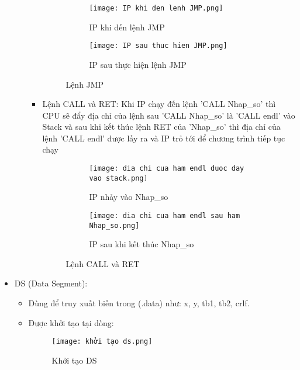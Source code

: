 \begin{itemize}
\begin{itemize}
\begin{itemize}
            \begin{figure}[H]
                \begin{subfigure}[b]{0.4\linewidth}
                    \centering
                    \texttt{[image: IP khi den lenh JMP.png]}
                    \caption{IP khi đến lệnh JMP}
                \end{subfigure}
                \hfill
                \begin{subfigure}[b]{0.4\linewidth}
                    \centering
                    \texttt{[image: IP sau thuc hien JMP.png]}
                    \caption{IP sau thực hiện lệnh JMP}
                \end{subfigure}
                \caption{Lệnh JMP}
            \end{figure}
            \item Lệnh CALL và RET: Khi IP chạy đến lệnh 'CALL Nhap\_so' thì CPU sẽ đẩy địa chỉ của lệnh sau 'CALL Nhap\_so' là 'CALL endl' vào Stack và sau khi kết thúc lệnh RET của 'Nhap\_so' thì địa chỉ của lệnh 'CALL endl' được lấy ra và IP trỏ tới để chương trình tiếp tục chạy
            \begin{figure}[H]
                \begin{subfigure}[b]{0.4\linewidth}
                    \centering
                    \texttt{[image: dia chi cua ham endl duoc day vao stack.png]}
                    \caption{IP nhảy vào Nhap\_so}
                \end{subfigure}
                \hfill
                \begin{subfigure}[b]{0.4\linewidth}
                    \centering
                    \texttt{[image: dia chi cua ham endl sau ham Nhap\_so.png]}
                    \caption{IP sau khi kết thúc Nhap\_so}
                \end{subfigure}
                \caption{Lệnh CALL và RET}
            \end{figure}
            
        \end{itemize}
    \end{itemize}

    \item DS (Data Segment): 
    \begin{itemize}
        \item Dùng để truy xuất biến trong (.data) như: x, y, tb1, tb2, crlf.
        \item Được khởi tạo tại dòng:
        \begin{figure}[h]
            \centering
            \texttt{[image: khởi tạo ds.png]}
            \caption{Khởi tạo DS}
        \end{figure}


\end{itemize}
\end{itemize}
